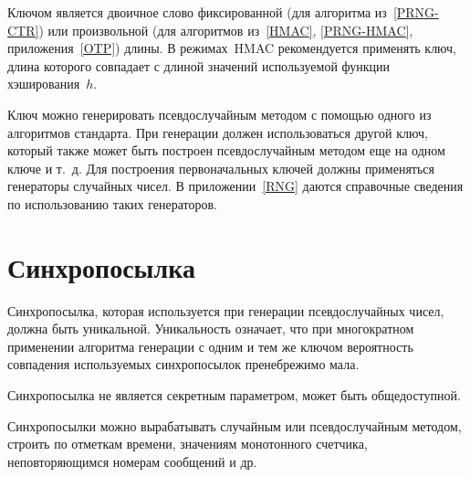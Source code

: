 Ключом является двоичное слово фиксированной 
(для алгоритма из~\ref{PRNG-CTR})
или произвольной 
(для алгоритмов из~\ref{HMAC}, \ref{PRNG-HMAC}, 
приложения~\ref{OTP}) длины.
%
В режимах~HMAC
рекомендуется применять ключ, длина которого совпадает с длиной значений 
используемой функции хэширования~$h$.

Ключ можно генерировать псевдослучайным методом с помощью одного 
из алгоритмов стандарта. При генерации должен использоваться другой 
ключ, который также может быть построен псевдослучайным методом еще
на одном ключе и т.~д. Для построения первоначальных ключей
должны применяться генераторы случайных чисел.
%
В приложении~\ref{RNG} даются справочные сведения по использованию таких 
генераторов. 

\section{Синхропосылка}

Синхропосылка, которая используется при генерации псевдослучайных чисел,
должна быть уникальной.
%
Уникальность означает, что при многократном применении алгоритма генерации 
с одним и тем же ключом вероятность совпадения используемых
синхропосылок пренебрежимо мала.

Синхропосылка не является секретным параметром, может быть общедоступной.

Синхропосылки можно вырабатывать случайным или псевдослучайным 
методом, строить по отметкам времени, значениям монотонного счетчика, 
неповторяющимся номерам сообщений и др.

